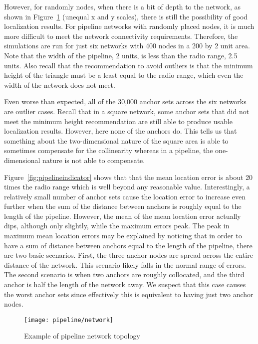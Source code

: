 However, for randomly nodes, when there is a bit of depth to the network, as shown in Figure~\ref{fig:pipeline} (unequal x and y scales), there is still the possibility of good localization results.  For pipeline networks with randomly placed nodes, it is much more difficult to meet the network connectivity requirements.  Therefore, the simulations are run for just six networks with 400 nodes in a 200 by 2 unit area.  Note that the width of the pipeline, 2 units, is less than the radio range, 2.5 units.  Also recall that the recommendation to avoid outliers is that the minimum height of the triangle must be a least equal to the radio range, which even the width of the network does not meet. 

Even worse than expected, all of the 30,000 anchor sets across the six networks are outlier cases.  Recall that in a square network, some anchor sets that did not meet the minimum height recommendation are still able to produce usable localization results.  However, here none of the anchors do.  This tells us that something about the two-dimensional nature of the square area is able to sometimes compensate for the collinearity whereas in a pipeline, the one-dimensional nature is not able to compensate.

Figure~\ref{fig:pipelineindicator} shows that that the mean location error is about 20 times the radio range which is well beyond any reasonable value. Interestingly, a relatively small number of anchor sets cause the location error to increase even further when the sum of the distance between anchors is roughly equal to the length of the pipeline.  However, the mean of the mean location error actually dips, although only slightly, while the maximum errors peak.  The peak in maximum mean location errors may be explained by noticing that in order to have a sum of distance between anchors equal to the length of the pipeline, there are two basic scenarios.  First, the three anchor nodes are spread across the entire distance of the network.  This scenario likely falls in the normal range of errors.  The second scenario is when two anchors are roughly collocated, and the third anchor is half the length of the network away.  We suspect that this case causes the worst anchor sets since effectively this is equivalent to having just two anchor nodes.

\begin{figure}
  \centering
	\texttt{[image: pipeline/network]}
	\caption{Example of pipeline network topology}
	\label{fig:pipeline}
\end{figure}

